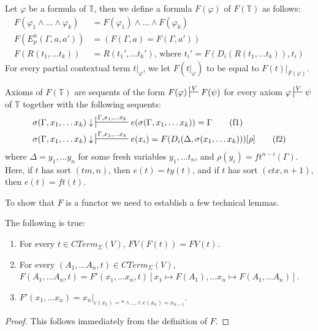 \documentclass[reqno]{amsart}
\newcommand{\axtag}[1]{\label{ax:#1} \tag{#1}}
\theoremstyle{definition}
\theoremstyle{remark}
\numberwithin{figure}{section}
\begin{document}
Let $\varphi$ be a formula of $\mathbb{T}$, then we define a formula $F(\varphi)$ of $F(\mathbb{T})$ as follows:
\begin{align*}
F(\varphi_1 \land \ldots \land \varphi_k) & = F(\varphi_1) \land \ldots \land F(\varphi_k) \\
F(E^n_p(\Gamma, a, a')) & = (F(\Gamma, a) = F(\Gamma, a')) \\
F(R(t_1, \ldots t_k)) & = R(t_1', \ldots t_k') \text{, where $t_i' = F(D_i(R(t_1, \ldots t_k)), t_i)$}
\end{align*}
For every partial contextual term $t|_\varphi$, we let $F(t|_\varphi)$ to be equal to $F(t)|_{F(\varphi)}$.

Axioms of $F(\mathbb{T})$ are sequents of the form $F(\varphi) \sststile{}{V} F(\psi)$ for every axiom $\varphi \sststile{}{V} \psi$ of $\mathbb{T}$ together with the following sequents:
\begin{align*}
\sigma(\Gamma, x_1, \ldots x_k) \downarrow & \sststile{}{\Gamma, x_1, \ldots x_k} e(\sigma(\Gamma, x_1, \ldots x_k)) = \Gamma \axtag{f1} \\
\sigma(\Gamma, x_1, \ldots x_k) \downarrow & \sststile{}{\Gamma, x_1, \ldots x_k} e(x_i) = F(D_i(\Delta, \sigma(x_1, \ldots x_k)))[\rho] \axtag{f2}
\end{align*}
where $\Delta = y_1, \ldots y_n$ for some fresh variables $y_1, \ldots t_n$, and $\rho(y_i) = ft^{n-i}(\Gamma)$.
Here, if $t$ has sort $(tm,n)$, then $e(t) = ty(t)$, and if $t$ has sort $(ctx,n+1)$, then $e(t) = ft(t)$.

To show that $F$ is a functor we need to establish a few technical lemmas.

\begin{lem}[F-basic]
The following is true:
\begin{enumerate}
\item \label{F-FV}
For every $t \in CTerm_\Sigma(V)$, $FV(F(t)) = FV(t)$.
\item \label{F-F'}
For every $(A_1, \ldots A_n, t) \in CTerm_\Sigma(V)$, $F(A_1, \ldots A_n, t) = F'(x_1, \ldots x_n, t) \allowbreak [x_1 \mapsto F(A_1), \ldots x_n \mapsto F(A_1, \ldots A_n)]$.
\item \label{F-var}
$F'(x_1, \ldots x_n) = x_n|_{e(x_1) = * \land \ldots \land e(x_n) = x_{n-1}}$.
\end{enumerate}
\end{lem}
\begin{proof}
This follows immediately from the definition of $F$.
\end{proof}
\end{document}
